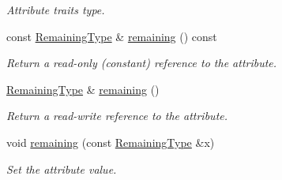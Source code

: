 \begin{DoxyCompactItemize}
\begin{DoxyCompactList}\small\item\em Attribute traits type. \item\end{DoxyCompactList}\item 
const \hyperlink{classopenstack_1_1xml_1_1RateLimit_a13144403e8af4dadd7e149adc68ff5d1}{RemainingType} \& \hyperlink{classopenstack_1_1xml_1_1RateLimit_a50c03e2fc85fd9f0dc263a11015d2491}{remaining} () const 
\begin{DoxyCompactList}\small\item\em Return a read-\/only (constant) reference to the attribute. \item\end{DoxyCompactList}\item 
\hyperlink{classopenstack_1_1xml_1_1RateLimit_a13144403e8af4dadd7e149adc68ff5d1}{RemainingType} \& \hyperlink{classopenstack_1_1xml_1_1RateLimit_aa1d66f42095ada9385341489ac90f737}{remaining} ()
\begin{DoxyCompactList}\small\item\em Return a read-\/write reference to the attribute. \item\end{DoxyCompactList}\item 
void \hyperlink{classopenstack_1_1xml_1_1RateLimit_a8150f8ecff2aaf0aaae80ff758eae13c}{remaining} (const \hyperlink{classopenstack_1_1xml_1_1RateLimit_a13144403e8af4dadd7e149adc68ff5d1}{RemainingType} \&x)
\begin{DoxyCompactList}\small\item\em Set the attribute value. \item\end{DoxyCompactList}\end{DoxyCompactItemize}
